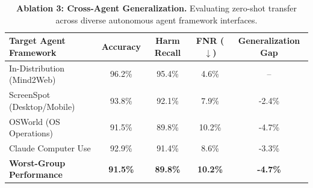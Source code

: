 \begin{table}[h]
\centering
\caption{\textbf{Ablation 3: Cross-Agent Generalization.} Evaluating zero-shot transfer across diverse autonomous agent framework interfaces.}
\label{tab:ablation_cross_agent}
\begin{tabular}{lcccc}
\toprule
\textbf{Target Agent Framework} & \textbf{Accuracy} & \textbf{Harm Recall} & \textbf{FNR ($\downarrow$)} & \textbf{Generalization Gap} \\
\midrule
In-Distribution (Mind2Web) & 96.2\% & 95.4\% & 4.6\% & -- \\
ScreenSpot (Desktop/Mobile) & 93.8\% & 92.1\% & 7.9\% & -2.4\% \\
OSWorld (OS Operations) & 91.5\% & 89.8\% & 10.2\% & -4.7\% \\
Claude Computer Use & 92.9\% & 91.4\% & 8.6\% & -3.3\% \\
\midrule
\textbf{Worst-Group Performance} & \textbf{91.5\%} & \textbf{89.8\%} & \textbf{10.2\%} & \textbf{-4.7\%} \\
\bottomrule
\end{tabular}
\end{table}
